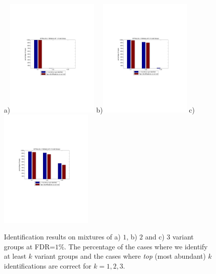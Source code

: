 %
%
%
\begin{figure}[htbp]
\centering %
a)\includegraphics[trim = 30mm 80mm 40mm 80mm,clip, width=0.4\textwidth]{fig/simulation/topkcorrect_1variant.pdf}
b)\includegraphics[trim = 30mm 80mm 40mm 80mm,clip, width=0.4\textwidth]{fig/simulation/topkcorrect_2variants.pdf}
c)\includegraphics[trim = 30mm 80mm 40mm 80mm,clip, width=0.4\textwidth]{fig/simulation/topkcorrect_3variants.pdf}
\caption[Identification results on mixtures of $1$, $2$ and $3$ variant groups]{Identification results on mixtures of a) $1$, b) $2$ and c) $3$ variant groups at FDR=$1\%$. The  percentage of the cases where we identify at least $k$ variant groups and the cases where \emph{top} (most abundant) $k$ identifications are correct for $k=1,2,3$.}
\label{fig:SimTopkCorrect}
\end{figure}

